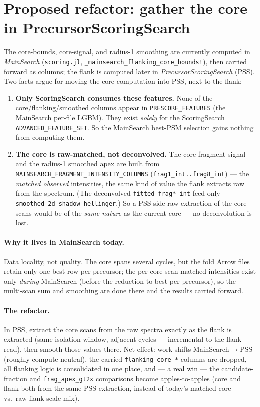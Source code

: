 \documentclass[11pt]{article}
\newcommand{\code}[1]{\texttt{#1}}
\begin{document}
\section{Proposed refactor: gather the core in PrecursorScoringSearch}
The core-bounds, core-signal, and radius-1 smoothing are currently computed in \emph{MainSearch}
(\code{scoring.jl}, \code{\_mainsearch\_flanking\_core\_bounds!}), then carried forward as columns;
the flank is computed later in \emph{PrecursorScoringSearch} (PSS). Two facts argue for moving the
core computation into PSS, next to the flank:
\begin{enumerate}
  \item \textbf{Only ScoringSearch consumes these features.} None of the core/flanking/smoothed
        columns appear in \code{PRESCORE\_FEATURES} (the MainSearch per-file LGBM). They exist
        \emph{solely} for the ScoringSearch \code{ADVANCED\_FEATURE\_SET}. So the MainSearch
        best-PSM selection gains nothing from computing them.
  \item \textbf{The core is raw-matched, not deconvolved.} The core fragment signal and the
        radius-1 smoothed apex are built from \code{MAINSEARCH\_FRAGMENT\_INTENSITY\_COLUMNS}
        (\code{frag1\_int..frag8\_int}) --- the \emph{matched observed} intensities, the same kind
        of value the flank extracts raw from the spectrum. (The deconvolved \code{fitted\_frag*\_int}
        feed only \code{smoothed\_2d\_shadow\_hellinger}.) So a PSS-side raw extraction of the core
        scans would be of the \emph{same nature} as the current core --- no deconvolution is lost.
\end{enumerate}

\paragraph{Why it lives in MainSearch today.} Data locality, not quality. The core spans several
cycles, but the fold Arrow files retain only one best row per precursor; the per-core-scan matched
intensities exist only \emph{during} MainSearch (before the reduction to best-per-precursor), so
the multi-scan sum and smoothing are done there and the results carried forward.

\paragraph{The refactor.} In PSS, extract the core scans from the raw spectra exactly as the flank
is extracted (same isolation window, adjacent cycles --- incremental to the flank read), then smooth
those values there. Net effect: work shifts MainSearch$\rightarrow$PSS (roughly compute-neutral),
the carried \code{flanking\_core\_*} columns are dropped, all flanking logic is consolidated in one
place, and --- a real win --- the candidate-fraction and \code{frag\_apex\_gt2x} comparisons become
apples-to-apples (core and flank both from the same PSS extraction, instead of today's
matched-core vs.\ raw-flank scale mix).
\end{document}
